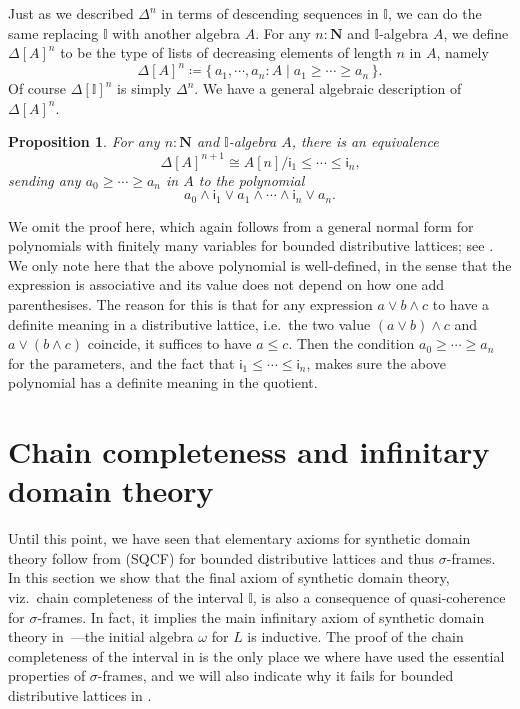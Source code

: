 \documentclass[a4paper,12pt]{amsart}
\newtheorem{proposition}[theorem]{Proposition}
\theoremstyle{definition}
\newcommand{\mb}[1]{\mathbf{#1}}
\newcommand{\mbb}[1]{\mathbb{#1}}
\newcommand{\I}{\mbb I}
\newcommand{\ms}[1]{\mathsf{#1}}
\newcommand{\scomp}[2]{\{\,#1\mid#2\,\}}
\newcommand{\N}{\mb N}
\begin{document}
Just as we described $\Delta^n$ in terms of descending sequences in $\I$, we can do the same replacing $\I$ with another algebra $A$.
For any $n : \N$ and $\I$-algebra $A$, we define $\Delta[A]^{n}$ to be the type of lists of decreasing elements of length $n$ in $A$, namely
\[ \Delta[A]^{n} \coloneq \scomp{a_1,\cdots,a_n : A}{a_1 \ge \cdots \ge a_n}\text{.} \]
Of course $\Delta[\I]^n$ is simply $\Delta^n$. We have a general algebraic description of $\Delta[A]^n$.

\begin{proposition}\label{prop:simplicesasalgebra}
  For any $n : \N$ and $\I$-algebra $A$, there is an equivalence 
  \[ \Delta[A]^{n+1} \cong A[n]/\ms{i}_1 \le \cdots \le \ms{i}_n\text{,} \]
  sending any $a_0 \ge \cdots \ge a_n$ in $A$ to the polynomial 
  \[ a_0 \wedge \ms{i}_1 \vee a_1 \wedge \cdots \wedge \ms{i}_n \vee a_n\text{.} \]
\end{proposition}

We omit the proof here, which again follows from a general normal form for polynomials with finitely many variables for bounded distributive lattices; see \citet[Ch.\ 1, Thm.\ 10.21]{lausch2000algebra}. We only note here that the above polynomial is well-defined, in the sense that the expression is associative and its value does not depend on how one add parenthesises. The reason for this is that for any expression $a \vee b \wedge c$ to have a definite meaning in a distributive lattice, i.e.\ the two value $(a \vee b) \wedge c$ and $a \vee (b \wedge c)$ coincide, it suffices to have $a \le c$. Then the condition $a_0 \ge \cdots \ge a_n$ for the parameters, and the fact that $\ms{i}_1 \le \cdots \le \ms{i}_n$, makes sure the above polynomial has a definite meaning in the quotient.


\section{Chain completeness and infinitary domain theory}\label{sec:infdomain}

Until this point, we have seen that elementary axioms for synthetic domain theory follow from (SQCF) for bounded distributive lattices and thus $\sigma$-frames. In this section we show that the final axiom of synthetic domain theory, viz.\ chain completeness of the interval $\I$, is also a consequence of quasi-coherence for $\sigma$-frames. In fact, it implies the main infinitary axiom of synthetic domain theory in~\citet{fiore-plotkin:1996}---the initial algebra $\omega$ for $L$ is inductive.
The proof of the chain completeness of the interval in  is the only place we where have used the essential properties of $\sigma$-frames, and we will also indicate why it fails for bounded distributive lattices in .
\end{document}
